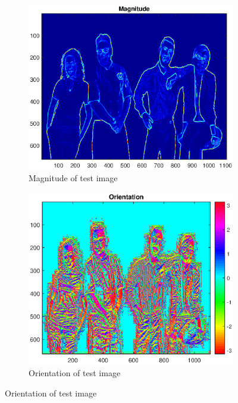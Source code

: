 \documentclass{article}
\newcommand{\tl}[1]{\textlatin{#1}}
\begin{document}
\begin{figure}[H]
		\begin{subfigure}[b]{0.5\textwidth}
			\includegraphics[width=\textwidth]{res/mag_test.eps}
			\caption{\tl{Magnitude of test image}}
		\end{subfigure}%
		\begin{subfigure}[b]{0.5\textwidth}
			\includegraphics[width=\textwidth]{res/ori_test.eps}
			\caption{\tl{Orientation of test image}}
		\end{subfigure}%
		

\end{figure}
\end{document}
